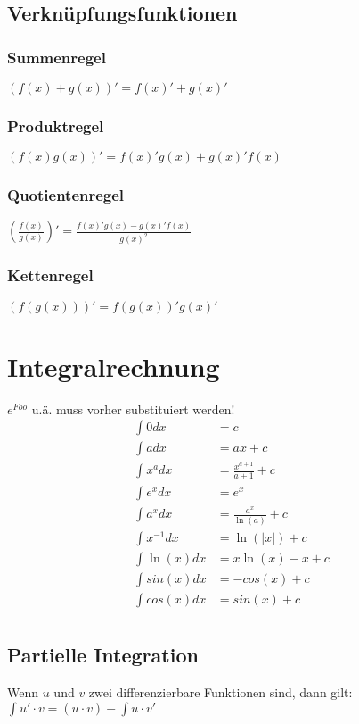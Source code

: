 \documentclass[a4paper, 8pt, landscape]{extarticle}
\let\oldint\int
\renewcommand{\int}{\ensuremath{\textstyle\oldint}}
\begin{document}
\begin{multicols*}{5}
        \subsection{Verknüpfungsfunktionen}
            \subsubsection{Summenregel}
            $(f(x) + g(x))' = f(x)' + g(x)'$  \\
            \subsubsection{Produktregel}
            $(f(x)g(x))' = f(x)'g(x)+g(x)'f(x)$  \\
            \subsubsection{Quotientenregel}
            $(\frac{f(x)}{g(x)})' = \frac{f(x)'g(x)-g(x)'f(x)}{g(x)^2}$ \\
            \subsubsection{Kettenregel}
            $(f(g(x)))' = f(g(x))'g(x)'$ \\
	\section{Integralrechnung}
	    $e^{Foo}$ u.ä. muss vorher substituiert werden!\\
        \begin{align*}
        	\int 0 dx &= c\\
	        \int a dx &= ax+c\\
	        \int x^a dx &= \frac{x^{a+1}}{a+1}+c\\
	        \int e^x dx &= e^x\\
	        \int a^x dx &= \frac{a^x}{\ln(a)}+c\\
	        \int x^{-1} dx &= \ln(|x|)+c\\
	        \int \ln (x) dx &= x\ln(x)-x +c\\
	        \int sin(x) dx &= -cos(x)+c\\
	        \int cos(x) dx &= sin(x)+c\\
        \end{align*}
        \subsection{Partielle Integration}
	        Wenn $u$ und $v$ zwei differenzierbare Funktionen sind, dann gilt: \\
	        $\int u' \cdot v = (u \cdot v) - \int u \cdot v'$

\end{multicols*}
\end{document}
